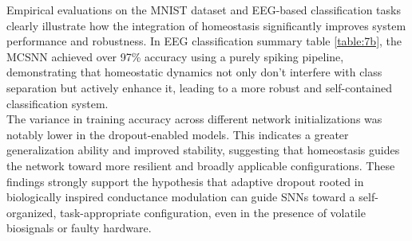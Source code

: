 \noindent Empirical evaluations on the MNIST dataset and EEG-based classification tasks clearly illustrate how the integration of homeostasis significantly improves system performance and robustness. In EEG classification summary table \ref{table:7b}, the MCSNN achieved over 97\% accuracy using a purely spiking pipeline, demonstrating that homeostatic dynamics not only don't interfere with class separation but actively enhance it, leading to a more robust and self-contained classification system.\\

\noindent The variance in training accuracy across different network initializations was notably lower in the dropout-enabled models. This indicates a greater generalization ability and improved stability, suggesting that homeostasis guides the network toward more resilient and broadly applicable configurations. These findings strongly support the hypothesis that adaptive dropout rooted in biologically inspired conductance modulation can guide SNNs toward a self-organized, task-appropriate configuration, even in the presence of volatile biosignals or faulty hardware.\\

\begin{table}[ht]
    \centering
    \caption{Classification accuracy (\%) for each stimulus class using PCA, t-SNE, and UMAP embeddings followed by logistic regression.}
    \label{table:7b}
\end{table}


